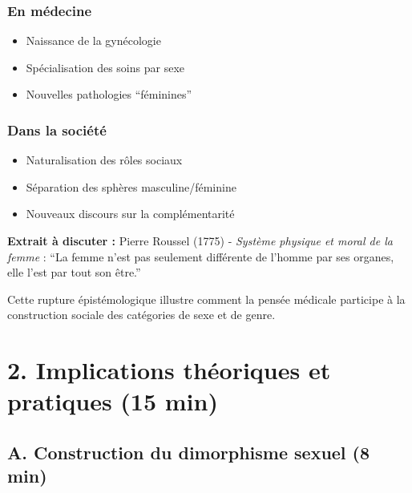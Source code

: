 \documentclass[
  letterpaper,
  DIV=11,
  numbers=noendperiod]{scrreprt}
\providecommand{\tightlist}{%
  \setlength{\itemsep}{0pt}\setlength{\parskip}{0pt}}\usepackage{longtable,booktabs,array}
\begin{document}
\subsection{En médecine}\label{en-muxe9decine}

\begin{itemize}
\tightlist
\item
  Naissance de la gynécologie
\item
  Spécialisation des soins par sexe
\item
  Nouvelles pathologies ``féminines''
\end{itemize}

\subsection{Dans la société}\label{dans-la-sociuxe9tuxe9}

\begin{itemize}
\tightlist
\item
  Naturalisation des rôles sociaux
\item
  Séparation des sphères masculine/féminine
\item
  Nouveaux discours sur la complémentarité
\end{itemize}

\textbf{Extrait à discuter :} Pierre Roussel (1775) - \emph{Système
physique et moral de la femme} : ``La femme n'est pas seulement
différente de l'homme par ses organes, elle l'est par tout son être.''

Cette rupture épistémologique illustre comment la pensée médicale
participe à la construction sociale des catégories de sexe et de genre.

\section{}\label{section-6}


\chapter{2. Implications théoriques et pratiques (15
min)}\label{implications-thuxe9oriques-et-pratiques-15-min}

\section{A. Construction du dimorphisme sexuel (8
min)}\label{a.-construction-du-dimorphisme-sexuel-8-min}
\end{document}
